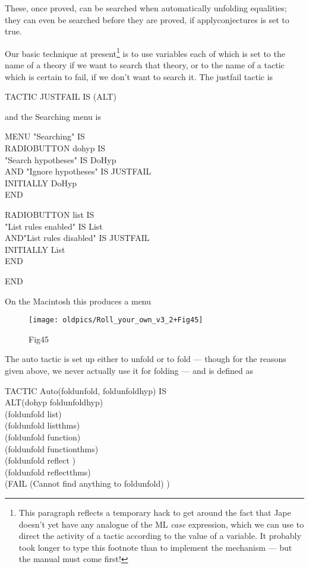 These, once proved, can be searched when automatically unfolding equalities; they can even be searched before they are proved, if applyconjectures is set to true.


Our basic technique at present\footnote{This paragraph reflects a temporary hack to get around the fact that Jape doesn't yet have any analogue of the ML \textit{case} expression, which we can use to direct the activity of a tactic according to the value of a variable. It probably took longer to type this footnote than to implement the mechanism --- but the manual must come first!} is to use variables each of which is set to the name of a theory if we want to search that theory, or to the name of a tactic which is certain to fail, if we don't want to search it. The justfail tactic is

TACTIC JUSTFAIL IS (ALT)


and the Searching menu is

MENU "Searching" IS\\
\tab RADIOBUTTON dohyp IS \\
\tab "Search hypotheses" IS DoHyp\\
\tab AND "Ignore hypotheses" IS JUSTFAIL\\
\tab INITIALLY DoHyp\\
\tab END

\tab RADIOBUTTON list IS \\
\tab "List rules enabled" IS List\\
\tab AND\tab  "List rules disabled" IS JUSTFAIL\\
\tab INITIALLY List\\
\tab END

\tab  END


On the Macintosh this produces a menu

\begin{figure}[htbp] \begin{center} \texttt{[image: oldpics/Roll\_your\_own\_v3\_2+Fig45]} \caption{Fig45} \end{center} \end{figure}


The auto tactic is set up either to unfold or to fold --- though for the reasons given above, we never actually use it for folding --- and is defined as

TACTIC Auto(foldunfold, foldunfoldhyp) IS \\
ALT\tab (dohyp foldunfoldhyp)\\
\tab (foldunfold list) \\
\tab (foldunfold listthms) \\
\tab (foldunfold function) \\
\tab (foldunfold functionthms) \\
\tab (foldunfold reflect ) \\
\tab (foldunfold reflectthms)\\
\tab (FAIL (Cannot find anything to foldunfold) )


